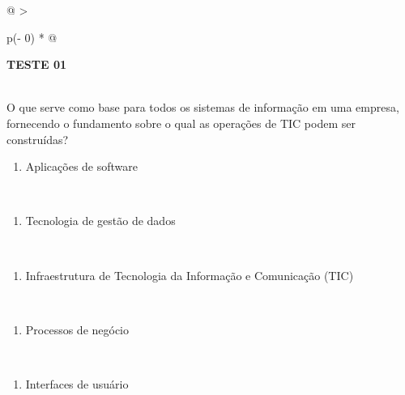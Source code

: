\documentclass[
]{book}
\providecommand{\tightlist}{%
  \setlength{\itemsep}{0pt}\setlength{\parskip}{0pt}}
\begin{document}
\begin{longtable}[]{@{}
  >{\raggedright\arraybackslash}p{(\columnwidth - 0\tabcolsep) * }@{}}
\toprule\noalign{}
\begin{minipage}[b]{\linewidth}\raggedright
\textbf{TESTE 01}
\end{minipage} \\
\midrule\noalign{}
\endhead
\bottomrule\noalign{}
\endlastfoot
O que serve como base para todos os sistemas de informação em uma empresa, fornecendo o fundamento sobre o qual as operações de TIC podem ser construídas? \\
\begin{minipage}[t]{\linewidth}\raggedright
\begin{enumerate}
\def\labelenumi{\Alph{enumi})}
\tightlist
\item
  Aplicações de software
\end{enumerate}
\end{minipage} \\
\begin{minipage}[t]{\linewidth}\raggedright
\begin{enumerate}
\def\labelenumi{\Alph{enumi})}
\setcounter{enumi}{1}
\tightlist
\item
  Tecnologia de gestão de dados
\end{enumerate}
\end{minipage} \\
\begin{minipage}[t]{\linewidth}\raggedright
\begin{enumerate}
\def\labelenumi{\Alph{enumi})}
\setcounter{enumi}{2}
\tightlist
\item
  Infraestrutura de Tecnologia da Informação e Comunicação (TIC)
\end{enumerate}
\end{minipage} \\
\begin{minipage}[t]{\linewidth}\raggedright
\begin{enumerate}
\def\labelenumi{\Alph{enumi})}
\setcounter{enumi}{3}
\tightlist
\item
  Processos de negócio
\end{enumerate}
\end{minipage} \\
\begin{minipage}[t]{\linewidth}\raggedright
\begin{enumerate}
\def\labelenumi{\Alph{enumi})}
\setcounter{enumi}{4}
\tightlist
\item
  Interfaces de usuário
\end{enumerate}
\end{minipage} \\
\end{longtable}
\end{document}
